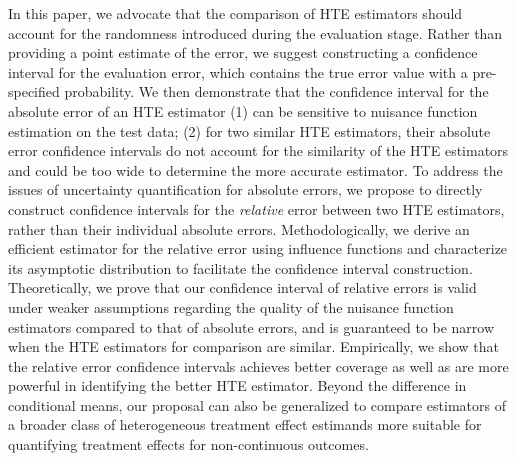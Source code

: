 \documentclass[twoside]{article}
\newcommand{\1}{{\mathbbm{1}}}
\begin{document}


In this paper, we advocate that the comparison of HTE estimators should account for the randomness introduced during the evaluation stage. 
Rather than providing a point estimate of the error, we suggest constructing a confidence interval for the evaluation error, which contains the true error value with a pre-specified probability.
We then demonstrate that the confidence interval for the absolute error of an HTE estimator (1) can be sensitive to nuisance function estimation on the test data; (2) for two similar HTE estimators, their absolute error confidence intervals do not account for the similarity of the HTE estimators and could be too wide to determine the more accurate estimator.
To address the issues of uncertainty quantification for absolute errors, we propose to directly construct confidence intervals for the \textit{relative} error between two HTE estimators, rather than their individual absolute errors. 
Methodologically, we derive an efficient estimator for the relative error using influence functions and characterize its asymptotic distribution to facilitate the confidence interval construction. 
Theoretically, we prove that our confidence interval of relative errors is valid under weaker assumptions regarding the quality of the nuisance function estimators compared to that of absolute errors, and is guaranteed to be narrow when the HTE estimators for comparison are similar.
Empirically, we show that the relative error confidence intervals achieves better coverage as well as are more powerful in identifying the better HTE estimator.
Beyond the difference in conditional means, our proposal can also be generalized to compare estimators of a broader class of heterogeneous treatment effect estimands more suitable for quantifying treatment effects for non-continuous outcomes.
\end{document}
